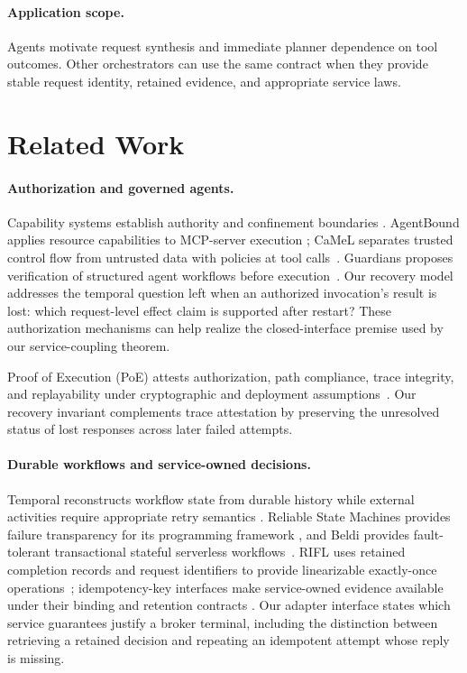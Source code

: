 \documentclass[acmsmall,screen,review,anonymous]{acmart}
\begin{document}
\paragraph{Application scope.}
Agents motivate request synthesis and immediate planner dependence on tool
outcomes. Other orchestrators can use the same contract when they provide
stable request identity, retained evidence, and appropriate service laws.

\section{Related Work}
\label{sec:related}

\paragraph{Authorization and governed agents.}
Capability systems establish authority and confinement boundaries
\cite{saltzer1975protection,lampson1974protection,watson2010capsicum}.
AgentBound applies resource capabilities to MCP-server execution
\cite{buehler2026agentbound}; CaMeL separates trusted control flow from
untrusted data with policies at tool calls~\cite{debenedetti2025camel}.
Guardians proposes verification of structured agent workflows before
execution~\cite{meijer2025guardians}. Our recovery model addresses the
temporal question left when an authorized invocation's result is lost:
which request-level effect claim is supported after restart? These
authorization mechanisms can help realize the closed-interface premise
used by our service-coupling theorem.

Proof of Execution (PoE) attests authorization, path compliance, trace
integrity, and replayability under cryptographic and deployment
assumptions~\cite{rhodes2026poe}. Our recovery invariant complements trace
attestation by preserving the unresolved status of lost responses across
later failed attempts.

\paragraph{Durable workflows and service-owned decisions.}
Temporal reconstructs workflow state from durable history while external
activities require appropriate retry semantics
\cite{temporal2026workflow,temporal2026activity}. Reliable State Machines
provides failure transparency for its programming framework
\cite{mukherjee2019rsm}, and Beldi provides fault-tolerant transactional
stateful serverless workflows~\cite{zhang2020beldi}. RIFL uses retained
completion records and request identifiers to provide linearizable
exactly-once operations~\cite{lee2015rifl}; idempotency-key interfaces make
service-owned evidence available under their binding and retention contracts
\cite{jena2025idempotency,stripe2026idempotency}. Our adapter interface states which service guarantees justify a broker
terminal, including the distinction between retrieving a retained decision
and repeating an idempotent attempt whose reply is missing.
\end{document}
